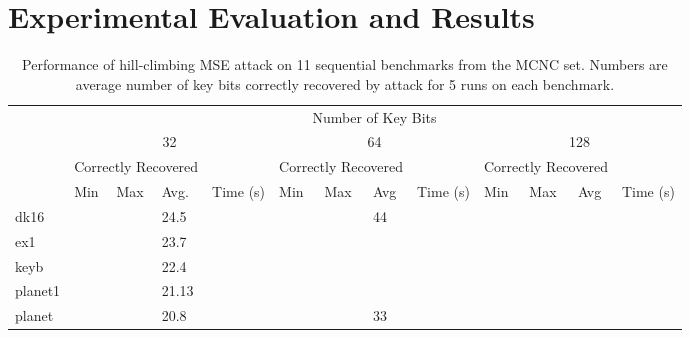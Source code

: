 \section{Experimental Evaluation and Results}



\begin{table*}[ht]
\centering
\caption{Performance of hill-climbing MSE attack on 11 sequential benchmarks from the MCNC set. Numbers are average number of key bits correctly recovered by attack for 5 runs on each benchmark.}
\label{my-label}
\begin{tabular}{|l|l|l|l|l|l|l|l|l|l|l|l|l|}
\hline
\multirow{4}{*}{} & \multicolumn{12}{c|}{Number of Key Bits}                                                                                                                        \\ \cline{2-13} 
                  & \multicolumn{4}{c|}{32}                             & \multicolumn{4}{c|}{64}                             & \multicolumn{4}{c|}{128}                            \\ \cline{2-13} 
                  & \multicolumn{3}{l|}{Correctly Recovered} &          & \multicolumn{3}{l|}{Correctly Recovered} &          & \multicolumn{3}{l|}{Correctly Recovered} &          \\ \cline{2-13} 
                  & Min         & Max         & Avg.         & Time (s) & Min         & Max         & Avg          & Time (s) & Min         & Max         & Avg          & Time (s) \\ \hline
dk16              &           &           & 24.5         &          &           &           &         44 &          &           &           &          &          \\ \hline
ex1              &           &           & 23.7         &          &           &           &            &          &           &           &          &          \\ \hline
keyb             &           &           & 22.4         &          &           &           &          &          & 
&           &          &          \\ \hline
planet1             &           &           & 21.13         &          &           &           &          &         &           &           &          &          \\ \hline
planet             &           &           & 20.8         &          &           &           &      33    &         &           &           &          &          \\ \hline

\end{tabular}
\end{table*}
